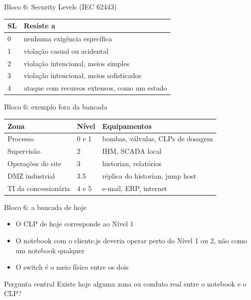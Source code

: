 \documentclass[12pt, aspectratio=169]{beamer}
\newcommand{\tblhead}[1]{\textcolor{TextPrimary}{\textbf{#1}}}
\begin{document}
\begin{frame}{Bloco 6: Security Levels (IEC 62443)}
  \begin{tabularx}{\textwidth}{@{}l X@{}}
    \rowcolor{PanelEdge}
    \tblhead{SL} & \tblhead{Resiste a} \\
    \midrule
    \rowcolor{PanelBg}
    0 & nenhuma exigência específica \\
    \rowcolor{PanelBg}
    1 & violação casual ou acidental \\
    \rowcolor{PanelBg}
    2 & violação intencional, meios simples \\
    \rowcolor{PanelBg}
    3 & violação intencional, meios sofisticados \\
    \rowcolor{PanelBg}
    4 & ataque com recursos extensos, como um estado \\
  \end{tabularx}
\end{frame}

\begin{frame}{Bloco 6: exemplo fora da bancada}
  \vspace{0.25cm}
  \small
  \begin{tabularx}{\textwidth}{@{}l l X@{}}
    \rowcolor{PanelEdge}
    \tblhead{Zona} & \tblhead{Nível} & \tblhead{Equipamentos} \\
    \midrule
    \rowcolor{PanelBg}
    Processo & 0 e 1 & bombas, válvulas, CLPs de dosagem \\
    \rowcolor{PanelBg}
    Supervisão & 2 & IHM, SCADA local \\
    \rowcolor{PanelBg}
    Operações do site & 3 & historian, relatórios \\
    \rowcolor{PanelBg}
    DMZ industrial & 3.5 & réplica do historian, jump host \\
    \rowcolor{PanelBg}
    TI da concessionária & 4 e 5 & e-mail, ERP, internet \\
  \end{tabularx}
\end{frame}

\begin{frame}{Bloco 6: a bancada de hoje}
  \vspace{0.3cm}
  \begin{itemize}
    \item O CLP de hoje corresponde ao Nível 1
    \item O notebook com o cliente.js deveria operar perto do Nível 1 ou 2, não como um notebook qualquer
    \item O switch é o meio físico entre os dois
  \end{itemize}

  \vspace{0.3cm}
  \begin{block}{Pergunta central}
    Existe hoje alguma zona ou conduto real entre o notebook e o CLP?
  \end{block}
\end{frame}
\end{document}
